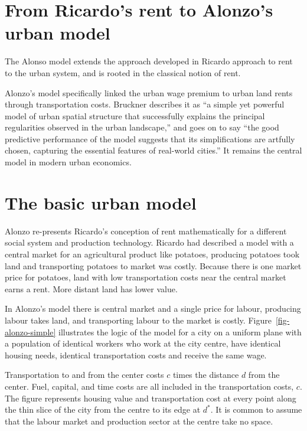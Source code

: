 
\section{From Ricardo's rent to Alonzo's urban model}


The Alonso model extends the approach developed in Ricardo approach to rent to the urban system, and is %
rooted in the classical notion of rent. 

 Alonzo's  model  specifically linked the urban wage premium to urban land rents through transportation costs. Bruckner \cite{bruecknerStructureUrbanEquilibria1987} describes it as ``a simple yet powerful model of urban spatial structure that successfully explains the principal regularities observed in the urban landscape,'' and goes on to say ``the good predictive performance of the model suggests that its simplifications are artfully chosen, capturing the essential features of real-world cities.'' It remains the central model in modern urban economics.

\section{The basic urban model}
Alonzo re-presents Ricardo's conception of rent mathematically for a different social system and production technology.  Ricardo had described a model with a central market for an agricultural product like potatoes, producing potatoes took land and transporting potatoes to market was costly. Because there is one market price for potatoes, land with low transportation costs near the central market earns a rent. More distant land has lower value. 

In Alonzo's model there is central market and a single price for labour, producing labour takes land, and transporting labour to the market is costly. Figure~\ref{fig-alonzo-simple} illustrates the logic of the model for a city on a uniform plane with a population of identical workers who work at the city centre, have identical housing needs, identical transportation costs and receive the same wage. 

Transportation to and from the center costs ${c}$ times the distance $d$ from the center. Fuel, capital, and time costs are  all included in the transportation costs, ${c}$. The figure represents housing value and transportation cost at every point along the thin slice of the city from the centre to its edge at $d^*$.  It is common to assume that the labour market and production sector at the centre take no space. 

